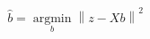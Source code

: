 \documentclass[10pt]{article}
\begin{document}
\begin{align*}\hat{b} = \operatorname*{argmin}_b \left\lVert z - X b \right\rVert^2\end{align*}
\end{document}
